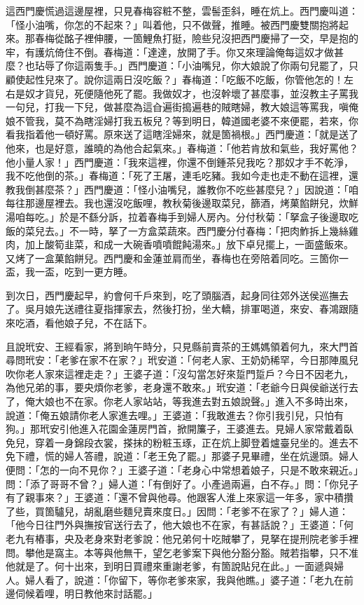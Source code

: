 這西門慶慌過這邊屋裡，只見春梅容粧不整，雲髻歪斜，睡在炕上。西門慶叫道：「怪小油嘴，你怎的不起來？」叫着他，只不做聲，推睡。被西門慶雙關抱將起來。那春梅從酩子裡伸腰，一箇鯉魚打挺，險些兒沒把西門慶掃了一交，早是抱的牢，有護炕倚住不倒。春梅道：「達達，放開了手。你又來理論俺每這奴才做甚麼？也玷辱了你這兩隻手。」{}西門慶道：「小油嘴兒，你大娘說了你兩句兒罷了，只顧使起性兒來了。說你這兩日沒吃飯？」春梅道：「吃飯不吃飯，你管他怎的！左右是奴才貨兒，死便隨他死了罷。我做奴才，也沒幹壞了甚麼事，並沒教主子罵我一句兒，打我一下兒，做甚麼為這㒲遍街搗遍巷的賊瞎婦，教大娘這等罵我，嗔俺娘不管我，莫不為瞎淫婦打我五板兒？{}等到明日，韓道國老婆不來便罷，若來，你看我指着他一頓好罵。原來送了這瞎淫婦來，就是箇禍根。」西門慶道：「就是送了他來，也是好意，誰曉的為他合起氣來。」春梅道：「他若肯放和氣些，我好罵他？他小量人家！」西門慶道：「我來這裡，你還不倒鍾茶兒我吃？那奴才手不乾淨，我不吃他倒的茶。」春梅道：「死了王屠，連毛吃豬。我如今走也走不動在這裡，還教我倒甚麼茶？」西門慶道：「怪小油嘴兒，誰教你不吃些甚麼兒？」因說道：「咱每往那邊屋裡去。我也還沒吃飯哩，教秋菊後邊取菜兒，篩酒，烤菓餡餅兒，炊鮮湯咱每吃。」於是不繇分訴，拉着春梅手到婦人房內。分付秋菊：「拏盒子後邊取吃飯的菜兒去。」不一時，拏了一方盒菜蔬來。西門慶分付春梅：「把肉鮓拆上幾絲雞肉，加上酸筍韭菜，和成一大碗香噴噴餛飩湯來。」放下卓兒擺上，一面盛飯來。又烤了一盒菓餡餅兒。西門慶和金蓮並肩而坐，春梅也在旁陪着同吃。三箇你一盃，我一盃，吃到一更方睡。

到次日，西門慶起早，約會何千戶來到，吃了頭腦酒，起身同往郊外送侯巡撫去了。吳月娘先送禮往夏指揮家去，然後打扮，坐大轎，排軍喝道，來安、春鴻跟隨來吃酒，看他娘子兒，不在話下。

且說玳安、王經看家，將到晌午時分，只見縣前賣茶的王媽媽領着何九，來大門首尋問玳安：「老爹在家不在家？」玳安道：「何老人家、王奶奶稀罕，今日那陣風兒吹你老人家來這裡走走？」王婆子道：「沒勾當怎好來踅門踅戶？今日不因老九，為他兄弟的事，要央煩你老爹，老身還不敢來。」玳安道：「老爺今日與侯爺送行去了，俺大娘也不在家。你老人家站站，等我進去對五娘說聲。」進入不多時出來，說道：「俺五娘請你老人家進去哩。」王婆道：「我敢進去？你引我引兒，只怕有狗。」那玳安引他進入花園金蓮房門首，掀開簾子，王婆進去。見婦人家常戴着臥免兒，穿着一身錦段衣裳，搽抹的粉粧玉琢，正在炕上脚登着爐臺兒坐的。進去不免下禮，慌的婦人答禮，說道：「老王免了罷。」{}那婆子見畢禮，坐在炕邊頭。婦人便問：「怎的一向不見你？」王婆子道：「老身心中常想着娘子，只是不敢來親近。」問：「添了哥哥不曾？」婦人道：「有倒好了。小產過兩遍，白不存。」問：「你兒子有了親事來？」王婆道：「還不曾與他尋。他跟客人淮上來家這一年多，家中積攢了些，買箇驢兒，胡亂磨些麵兒賣來度日。」因問：「老爹不在家了？」婦人道：「他今日往門外與撫按官送行去了，他大娘也不在家，有甚話說？」王婆道：「何老九有樁事，央及老身來對老爹說：他兄弟何十吃賊攀了，{}見拏在提刑院老爹手裡問。攀他是窩主。本等與他無干，望乞老爹案下與他分豁分豁。賊若指攀，只不准他就是了。何十出來，到明日買禮來重謝老爹，有箇說貼兒在此。」一面遞與婦人。婦人看了，說道：「你留下，等你老爹來家，我與他瞧。」婆子道：「老九在前邊伺候着哩，明日教他來討話罷。」

